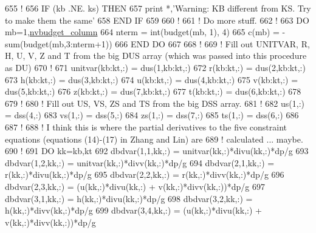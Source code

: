 \begin{DoxyCode}
655 \textcolor{comment}{!}
656 \textcolor{keywordflow}{IF} (kb .NE. ks) \textcolor{keywordflow}{THEN}
657     print *,\textcolor{stringliteral}{'Warning: KB different from KS. Try to make them the same'}
658 \textcolor{keywordflow}{END IF}
659 
660 \textcolor{comment}{!}
661 \textcolor{comment}{! Do more stuff.}
662 \textcolor{comment}{!}
663 \textcolor{keywordflow}{DO} mb=1,\hyperlink{namespacesettings_a78876a80ce867f4bc71866b783b6de89}{nvbudget\_column}
664     nterm   = int(budget(mb, 1), 4)
665     c(mb)   = -sum(budget(mb,3:nterm+1))
666 \textcolor{keywordflow}{END DO}
667 
668 \textcolor{comment}{!}
669 \textcolor{comment}{! Fill out UNITVAR, R, H, U, V, Z and T from the big DUS array (which was passed into this procedure as DU)}
670 \textcolor{comment}{!}
671 unitvar(kb:kt,:)    = dus(1,kb:kt,:)
672 r(kb:kt,:)          = dus(2,kb:kt,:)
673 h(kb:kt,:)          = dus(3,kb:kt,:)
674 u(kb:kt,:)          = dus(4,kb:kt,:)
675 v(kb:kt,:)          = dus(5,kb:kt,:)
676 z(kb:kt,:)          = dus(7,kb:kt,:)
677 t(kb:kt,:)          = dus(6,kb:kt,:)
678 
679 \textcolor{comment}{!}
680 \textcolor{comment}{! Fill out US, VS, ZS and TS from the big DSS array.}
681 \textcolor{comment}{!}
682 us(1,:)             = dss(4,:)
683 vs(1,:)             = dss(5,:)
684 zs(1,:)             = dss(7,:)
685 ts(1,:)             = dss(6,:)
686 
687 \textcolor{comment}{!}
688 \textcolor{comment}{! I think this is where the partial derivatives to the five constraint equations (equations (14)-(17) in
       Zhang and Lin) are}
689 \textcolor{comment}{! calculated ... maybe.}
690 \textcolor{comment}{!}
691 \textcolor{keywordflow}{DO} kk=kb,kt
692     dbdvar(1,1,kk,:)    = unitvar(kk,:)*divu(kk,:)*dp/\hyperlink{namespaceconstants_a046aef138fbc8d05251d4fdc6eb3ee89}{g}
693     dbdvar(1,2,kk,:)    = unitvar(kk,:)*divv(kk,:)*dp/\hyperlink{namespaceconstants_a046aef138fbc8d05251d4fdc6eb3ee89}{g}
694     dbdvar(2,1,kk,:)    = r(kk,:)*divu(kk,:)*dp/\hyperlink{namespaceconstants_a046aef138fbc8d05251d4fdc6eb3ee89}{g}
695     dbdvar(2,2,kk,:)    = r(kk,:)*divv(kk,:)*dp/\hyperlink{namespaceconstants_a046aef138fbc8d05251d4fdc6eb3ee89}{g}
696     dbdvar(2,3,kk,:)    = (u(kk,:)*divu(kk,:) + v(kk,:)*divv(kk,:))*dp/\hyperlink{namespaceconstants_a046aef138fbc8d05251d4fdc6eb3ee89}{g}
697     dbdvar(3,1,kk,:)    = h(kk,:)*divu(kk,:)*dp/\hyperlink{namespaceconstants_a046aef138fbc8d05251d4fdc6eb3ee89}{g}
698     dbdvar(3,2,kk,:)    = h(kk,:)*divv(kk,:)*dp/\hyperlink{namespaceconstants_a046aef138fbc8d05251d4fdc6eb3ee89}{g}
699     dbdvar(3,4,kk,:)    = (u(kk,:)*divu(kk,:) + v(kk,:)*divv(kk,:))*dp/\hyperlink{namespaceconstants_a046aef138fbc8d05251d4fdc6eb3ee89}{g}

\end{DoxyCode}
